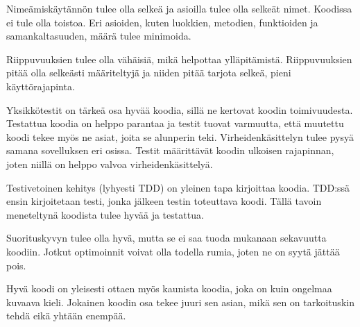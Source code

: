 Nimeämiskäytännön tulee olla selkeä ja asioilla tulee olla selkeät nimet.
Koodissa ei tule olla toistoa. Eri asioiden, kuten luokkien, metodien,
funktioiden ja samankaltasuuden, määrä tulee minimoida.

Riippuvuuksien tulee olla vähäisiä, mikä helpottaa ylläpitämistä. Riippuvuuksien
pitää olla selkeästi määriteltyjä ja niiden pitää tarjota selkeä, pieni
käyttörajapinta.

Yksikkötestit on tärkeä osa hyvää koodia, sillä ne kertovat koodin
toimivuudesta. Testattua koodia on helppo parantaa ja testit tuovat varmuutta,
että muutettu koodi tekee myös ne asiat, joita se alunperin teki.
Virheidenkäsittelyn tulee pysyä samana sovelluksen eri osissa. Testit
määrittävät koodin ulkoisen rajapinnan, joten niillä on helppo valvoa
virheidenkäsittelyä.

Testivetoinen kehitys (lyhyesti TDD) on yleinen tapa kirjoittaa koodia. TDD:ssä
ensin kirjoitetaan testi, jonka jälkeen testin toteuttava koodi. Tällä tavoin
meneteltynä koodista tulee hyvää ja testattua.

Suorituskyvyn tulee olla hyvä, mutta se ei saa tuoda mukanaan sekavuutta
koodiin. Jotkut optimoinnit voivat olla todella rumia, joten ne on syytä jättää
pois.

Hyvä koodi on yleisesti ottaen myös kaunista koodia, joka on kuin ongelmaa
kuvaava kieli. Jokainen koodin osa tekee juuri sen asian, mikä sen on
tarkoituskin tehdä eikä yhtään enempää.
